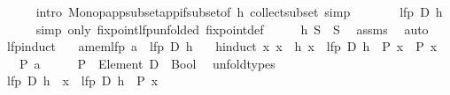 \begin{isabellebody}
\ \ \ \ \isamarkupfalse%
\ {\isacharparenleft}{\kern0pt}intro\ Monop{\isacharunderscore}{\kern0pt}app{\isacharunderscore}{\kern0pt}subset{\isacharunderscore}{\kern0pt}app{\isacharunderscore}{\kern0pt}if{\isacharunderscore}{\kern0pt}subset{\isacharbrackleft}{\kern0pt}of\ h{\isacharbrackright}{\kern0pt}\ collect{\isacharunderscore}{\kern0pt}subset{\isacharparenright}{\kern0pt}\ simp\isanewline
\ \ \isamarkupfalse%
\ \isamarkupfalse%
\ {\isachardoublequoteopen}{\isachardot}{\kern0pt}{\isachardot}{\kern0pt}{\isachardot}{\kern0pt}\ {\isacharequal}{\kern0pt}\ lfp\ D\ h{\isachardoublequoteclose}\isanewline
\ \ \ \ \isamarkupfalse%
\ {\isacharparenleft}{\kern0pt}simp\ only{\isacharcolon}{\kern0pt}\ fixpoint{\isacharunderscore}{\kern0pt}lfp{\isacharbrackleft}{\kern0pt}unfolded\ fixpoint{\isacharunderscore}{\kern0pt}def{\isacharbrackright}{\kern0pt}{\isacharparenright}{\kern0pt}\isanewline
\ \ \isamarkupfalse%
\ \isamarkupfalse%
\ {\isachardoublequoteopen}h\ {\isacharquery}{\kern0pt}S\ {\isasymsubseteq}\ {\isacharquery}{\kern0pt}S{\isachardoublequoteclose}\ \isamarkupfalse%
\ assms\ \isamarkupfalse%
\ auto\isanewline
{}\isamarkupfalse%
%
\endisatagproof
{\isafoldproof}%
%
\isadelimproof
\isanewline
%
\endisadelimproof
\isanewline
{}\isamarkupfalse%
\ lfp{\isacharunderscore}{\kern0pt}induct{\isacharcolon}{\kern0pt}\isanewline
\ \ \ a{\isacharunderscore}{\kern0pt}mem{\isacharunderscore}{\kern0pt}lfp{\isacharcolon}{\kern0pt}\ {\isachardoublequoteopen}a\ {\isasymin}\ lfp\ D\ h{\isachardoublequoteclose}\isanewline
\ \ \ h{\isacharunderscore}{\kern0pt}induct{\isacharcolon}{\kern0pt}\ {\isachardoublequoteopen}{\isasymAnd}x{\isachardot}{\kern0pt}\ x\ {\isasymin}\ h\ {\isacharbraceleft}{\kern0pt}x\ {\isasymin}\ lfp\ D\ h\ {\isacharbar}{\kern0pt}\ P\ x{\isacharbraceright}{\kern0pt}\ {\isasymLongrightarrow}\ P\ x{\isachardoublequoteclose}\isanewline
\ \ \ {\isachardoublequoteopen}P\ a{\isachardoublequoteclose}\isanewline
%
\isadelimproof
%
\endisadelimproof
%
\isatagproof
{}\isamarkupfalse%
\ {\isacharminus}{\kern0pt}\isanewline
\ \ \isamarkupfalse%
\ {\isachardoublequoteopen}P\ {\isacharcolon}{\kern0pt}\ Element\ D\ {\isasymRightarrow}\ Bool{\isachardoublequoteclose}\ \isamarkupfalse%
\ unfold{\isacharunderscore}{\kern0pt}types\isanewline
\ \ \isamarkupfalse%
\ {\isachardoublequoteopen}lfp\ D\ h\ {\isasymsubseteq}\ {\isacharbraceleft}{\kern0pt}x\ {\isasymin}\ lfp\ D\ h\ {\isacharbar}{\kern0pt}\ P\ x{\isacharbraceright}{\kern0pt}{\isachardoublequoteclose}\isanewline

\end{isabellebody}
